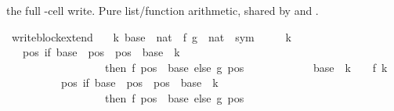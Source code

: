 \begin{isabellebody}
\begin{isamarkuptext}
  the full -cell write.  Pure list/function arithmetic, shared
  by  and
  .%
\end{isamarkuptext}\isamarkuptrue%
\isamarkupfalse%
\ write{\isacharunderscore}{\kern0pt}block{\isacharunderscore}{\kern0pt}extend{\isacharcolon}{\kern0pt}\isanewline
\ \ \ k\ base\ {\isacharcolon}{\kern0pt}{\isacharcolon}{\kern0pt}\ nat\ \ f\ g\ {\isacharcolon}{\kern0pt}{\isacharcolon}{\kern0pt}\ {\isachardoublequoteopen}nat\ {\isasymRightarrow}\ sym{}{\isachardoublequoteclose}\isanewline
\ \ \ {\isachardoublequoteopen}{}\ {\isacharless}{\kern0pt}\ k{\isachardoublequoteclose}\isanewline
\ \ \ {\isachardoublequoteopen}{\isacharparenleft}{\kern0pt}{\isacharparenleft}{\kern0pt}{\isasymlambda}pos{\isachardot}{\kern0pt}\ if\ base\ {\isasymle}\ pos\ {\isasymand}\ pos\ {\isacharless}{\kern0pt}\ base\ {\isacharplus}{\kern0pt}\ {\isacharparenleft}{\kern0pt}k\ {\isacharminus}{\kern0pt}\ {}{\isacharparenright}{\kern0pt}\isanewline
\ \ \ \ \ \ \ \ \ \ \ \ \ \ \ \ \ \ then\ f\ {\isacharparenleft}{\kern0pt}pos\ {\isacharminus}{\kern0pt}\ base{\isacharparenright}{\kern0pt}\ else\ g\ pos{\isacharparenright}{\kern0pt}\isanewline
\ \ \ \ \ \ \ \ \ \ \ \ {\isacharparenleft}{\kern0pt}base\ {\isacharplus}{\kern0pt}\ {\isacharparenleft}{\kern0pt}k\ {\isacharminus}{\kern0pt}\ {}{\isacharparenright}{\kern0pt}\ {\isacharcolon}{\kern0pt}{\isacharequal}{\kern0pt}\ f\ {\isacharparenleft}{\kern0pt}k\ {\isacharminus}{\kern0pt}\ {}{\isacharparenright}{\kern0pt}{\isacharparenright}{\kern0pt}{\isacharparenright}{\kern0pt}\isanewline
\ \ \ \ \ \ \ \ \ {\isacharequal}{\kern0pt}\ {\isacharparenleft}{\kern0pt}{\isasymlambda}pos{\isachardot}{\kern0pt}\ if\ base\ {\isasymle}\ pos\ {\isasymand}\ pos\ {\isacharless}{\kern0pt}\ base\ {\isacharplus}{\kern0pt}\ k\isanewline
\ \ \ \ \ \ \ \ \ \ \ \ \ \ \ \ \ \ then\ f\ {\isacharparenleft}{\kern0pt}pos\ {\isacharminus}{\kern0pt}\ base{\isacharparenright}{\kern0pt}\ else\ g\ pos{\isacharparenright}{\kern0pt}{\isachardoublequoteclose}\isanewline
%
\isadelimproof
%
\endisadelimproof
%
\isatagproof
{}\isamarkupfalse%
\ {\isacharminus}{\kern0pt}\isanewline
\ \ \isamarkupfalse%

\end{isabellebody}
